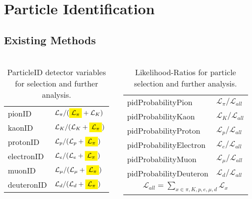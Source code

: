 \documentclass{beamer}
\newcommand{\mathcolorbox}[2]{\colorbox{#1}{$\displaystyle #2$}}
\begin{document}
\section{Particle Identification}
\subsection{Existing Methods}
\begin{frame}
	\frametitle{\insertsection}
	\framesubtitle{\insertsubsection}

	\begin{columns}
		\begin{column}{0.47\textwidth}
			\begin{table}
				\begin{tabular}{l|l}
					pionID & $\mathcal{L}_{\pi} / (\mathcolorbox{yellow}{\mathcal{L}_{\pi}} + \mathcal{L}_{K})$ \\
					kaonID & $\mathcal{L}_{K} / (\mathcal{L}_{K} +\mathcolorbox{yellow}{\mathcal{L}_{\pi}})$ \\
					protonID & $\mathcal{L}_{p} / (\mathcal{L}_{p} +\mathcolorbox{yellow}{\mathcal{L}_{\pi}})$ \\
					electronID & $\mathcal{L}_{e} / (\mathcal{L}_{e} +\mathcolorbox{yellow}{\mathcal{L}_{\pi}})$ \\
					muonID & $\mathcal{L}_{\mu} / (\mathcal{L}_{\mu} +\mathcolorbox{yellow}{\mathcal{L}_{\pi}})$ \\
					deuteronID & $\mathcal{L}_{d} / (\mathcal{L}_{d} +\mathcolorbox{yellow}{\mathcal{L}_{\pi}})$
				\end{tabular}
				\caption{ParticleID detector variables for selection and further analysis.}
			\end{table}
		\end{column}
		\begin{column}{0.5\textwidth}
			\begin{table}
				\begin{tabular}{l|l}
					pidProbabilityPion & $\mathcal{L}_{\pi} / \mathcal{L}_{all}$ \\
					pidProbabilityKaon & $\mathcal{L}_{K} / \mathcal{L}_{all}$ \\
					pidProbabilityProton & $\mathcal{L}_{p} / \mathcal{L}_{all}$ \\
					pidProbabilityElectron & $\mathcal{L}_{e} / \mathcal{L}_{all}$ \\
					pidProbabilityMuon & $\mathcal{L}_{\mu} / \mathcal{L}_{all}$ \\
					pidProbabilityDeuteron & $\mathcal{L}_{d} / \mathcal{L}_{all}$ \\
					\hline
					\multicolumn{2}{c}{$\mathcal{L}_{all} = \sum \limits_{x \in {\pi, K, p, e, \mu, d}} \mathcal{L}_{x}$}
				\end{tabular}
				\caption{Likelihood-Ratios for particle selection and further analysis.}
			\end{table}
		\end{column}
	\end{columns}
\end{frame}
\end{document}
